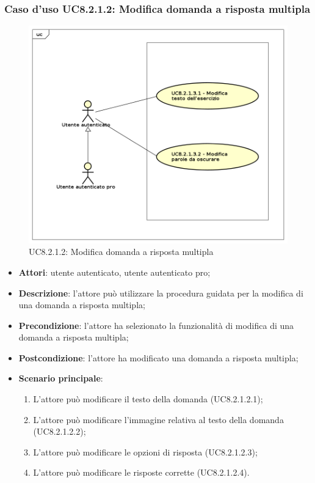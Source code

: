 \subsubsection{Caso d'uso UC8.2.1.2: Modifica domanda a risposta multipla}
	\label{UC8.2.1.2}
	\begin{figure}[h]
		\centering
			\includegraphics[scale=0.45,keepaspectratio]{UML/UC8_2_1_2.png}
		\caption{UC8.2.1.2: Modifica domanda a risposta multipla}
	\end{figure}
	\FloatBarrier
	\begin{itemize}
		\item
			\textbf{Attori}: utente autenticato, utente autenticato pro;
		\item		
			\textbf{Descrizione}: l'attore può utilizzare la procedura guidata per la modifica di una domanda a risposta multipla;
		\item
			\textbf{Precondizione}: l'attore ha selezionato la funzionalità di modifica di una domanda a risposta multipla; 
		\item
			\textbf{Postcondizione}: l'attore ha modificato una domanda a risposta multipla;
		\item
			\textbf{Scenario principale}:
	       		\begin{enumerate}
	       			\item
	       			L'attore può modificare il testo della domanda (UC8.2.1.2.1);
	       			\item
	       			L'attore può modificare l'immagine relativa al testo della domanda (UC8.2.1.2.2);
	       			\item
	       			L'attore può modificare le opzioni di risposta (UC8.2.1.2.3);
					\item
					L'attore può modificare le risposte corrette (UC8.2.1.2.4).
	 			\end{enumerate}
	\end{itemize}

